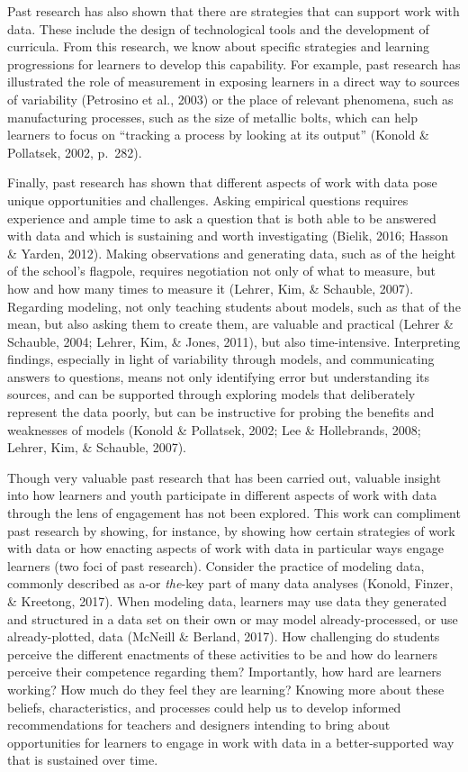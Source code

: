 \documentclass[]{book}
\theoremstyle{definition}
\theoremstyle{definition}
\theoremstyle{definition}
\theoremstyle{remark}
\begin{document}
Past research has also shown that there are strategies that can support
work with data. These include the design of technological tools and the
development of curricula. From this research, we know about specific
strategies and learning progressions for learners to develop this
capability. For example, past research has illustrated the role of
measurement in exposing learners in a direct way to sources of
variability (Petrosino et al., 2003) or the place of relevant phenomena,
such as manufacturing processes, such as the size of metallic bolts,
which can help learners to focus on ``tracking a process by looking at
its output'' (Konold \& Pollatsek, 2002, p.~282).

Finally, past research has shown that different aspects of work with
data pose unique opportunities and challenges. Asking empirical
questions requires experience and ample time to ask a question that is
both able to be answered with data and which is sustaining and worth
investigating (Bielik, 2016; Hasson \& Yarden, 2012). Making
observations and generating data, such as of the height of the school's
flagpole, requires negotiation not only of what to measure, but how and
how many times to measure it (Lehrer, Kim, \& Schauble, 2007). Regarding
modeling, not only teaching students about models, such as that of the
mean, but also asking them to create them, are valuable and practical
(Lehrer \& Schauble, 2004; Lehrer, Kim, \& Jones, 2011), but also
time-intensive. Interpreting findings, especially in light of
variability through models, and communicating answers to questions,
means not only identifying error but understanding its sources, and can
be supported through exploring models that deliberately represent the
data poorly, but can be instructive for probing the benefits and
weaknesses of models (Konold \& Pollatsek, 2002; Lee \& Hollebrands,
2008; Lehrer, Kim, \& Schauble, 2007).

Though very valuable past research that has been carried out, valuable
insight into how learners and youth participate in different aspects of
work with data through the lens of engagement has not been explored.
This work can compliment past research by showing, for instance, by
showing how certain strategies of work with data or how enacting aspects
of work with data in particular ways engage learners (two foci of past
research). Consider the practice of modeling data, commonly described as
a-or \emph{the}-key part of many data analyses (Konold, Finzer, \&
Kreetong, 2017). When modeling data, learners may use data they
generated and structured in a data set on their own or may model
already-processed, or use already-plotted, data (McNeill \& Berland,
2017). How challenging do students perceive the different enactments of
these activities to be and how do learners perceive their competence
regarding them? Importantly, how hard are learners working? How much do
they feel they are learning? Knowing more about these beliefs,
characteristics, and processes could help us to develop informed
recommendations for teachers and designers intending to bring about
opportunities for learners to engage in work with data in a
better-supported way that is sustained over time.
\end{document}
